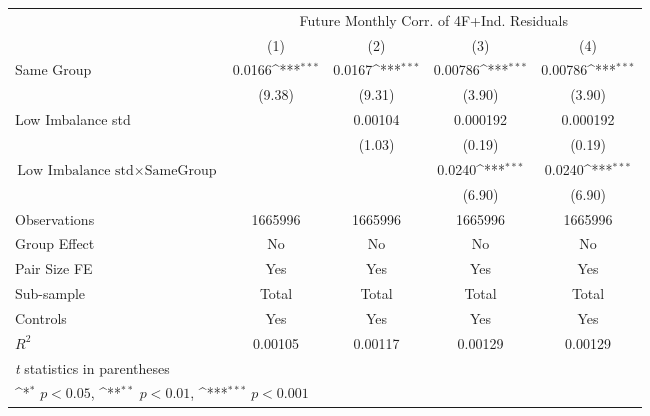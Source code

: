 {
\def\sym#1{\ifmmode^{#1}\else\(^{#1}\)\fi}
\begin{tabular}{l*{4}{c}}
\hline\hline
                &\multicolumn{4}{c}{Future Monthly Corr. of 4F+Ind. Residuals}              \\\cmidrule(lr){2-5}
                &\multicolumn{1}{c}{(1)}         &\multicolumn{1}{c}{(2)}         &\multicolumn{1}{c}{(3)}         &\multicolumn{1}{c}{(4)}         \\
\hline
Same Group      &   0.0166\sym{***}&   0.0167\sym{***}&  0.00786\sym{***}&  0.00786\sym{***}\\
                &   (9.38)         &   (9.31)         &   (3.90)         &   (3.90)         \\
[1em]
Low Imbalance std&                  &  0.00104         & 0.000192         & 0.000192         \\
                &                  &   (1.03)         &   (0.19)         &   (0.19)         \\
[1em]
 $ \text{Low Imbalance std} \times {\text{SameGroup} } $ &                  &                  &   0.0240\sym{***}&   0.0240\sym{***}\\
                &                  &                  &   (6.90)         &   (6.90)         \\
\hline
Observations    &  1665996         &  1665996         &  1665996         &  1665996         \\
Group Effect    &       No         &       No         &       No         &       No         \\
Pair Size FE    &      Yes         &      Yes         &      Yes         &      Yes         \\
Sub-sample      &    Total         &    Total         &    Total         &    Total         \\
Controls        &      Yes         &      Yes         &      Yes         &      Yes         \\
$ R^2 $         &  0.00105         &  0.00117         &  0.00129         &  0.00129         \\
\hline\hline
\multicolumn{5}{l}{\footnotesize \textit{t} statistics in parentheses}\\
\multicolumn{5}{l}{\footnotesize \sym{*} \(p<0.05\), \sym{**} \(p<0.01\), \sym{***} \(p<0.001\)}\\
\end{tabular}
}
